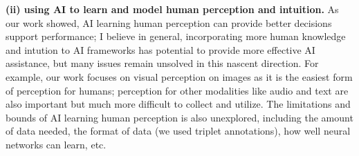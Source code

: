 \textbf{(ii) using AI to learn and model human perception and intuition.} 
As our work showed, AI learning human perception can provide better decisions support performance; I believe in general, incorporating more human knowledge and intution to AI frameworks has potential to provide more effective AI assistance, but many issues remain unsolved in this nascent direction. 
For example, our work focuses on visual perception on images as it is the easiest form of perception for humans; perception for other modalities like audio and text are also important but much more difficult to collect and utilize. The limitations and bounds of AI learning human perception is also unexplored, including the amount of data needed, the format of data (we used triplet annotations), how well neural networks can learn, etc.






